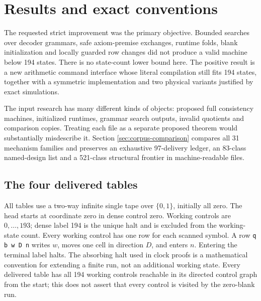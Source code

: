 \documentclass[11pt,a4paper]{article}
\begin{document}
\tableofcontents
\newpage

\section{Results and exact conventions}
\label{sec:results}

The requested strict improvement was the primary objective. Bounded
searches over decoder grammars, safe axiom-premise exchanges, runtime
folds, blank initialization and locally guarded row changes did not
produce a valid machine below 194 states. There is no state-count lower
bound here. The positive result is a new arithmetic command interface
whose literal compilation still fits 194 states, together with a symmetric
implementation and two physical variants justified by exact simulations.

The input research has many different kinds of objects: proposed full
consistency machines, initialized runtimes, grammar search outputs,
invalid quotients and comparison copies. Treating each file as a separate
proposed theorem would substantially misdescribe it. Section
\ref{sec:corpus-comparison} compares all 31 mechanism families and preserves
an exhaustive 97-delivery ledger, an 83-class named-design list and a
521-class structural frontier in machine-readable files.

\subsection{The four delivered tables}

All tables use a two-way infinite single tape over $\{0,1\}$, initially
all zero. The head starts at coordinate zero in dense control zero.
Working controls are $0,\ldots,193$; dense label 194 is the unique halt
and is excluded from the working-state count. Every working control has
one row for each scanned symbol. A row
\texttt{q b w D n} writes $w$, moves one cell in direction $D$, and enters
$n$. Entering the terminal label halts. The absorbing halt used in clock
proofs is a mathematical convention for extending a finite run, not an
additional working state. Every delivered table has all 194 working
controls reachable in its directed control graph from the start; this
does not assert that every control is visited by the zero-blank run.
\end{document}
